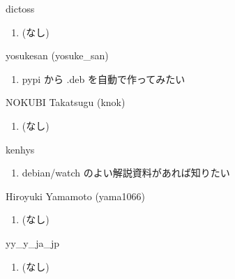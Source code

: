 \begin{prework}{ dictoss }
  \begin{enumerate}
  \item (なし)
  \end{enumerate}
\end{prework}

\begin{prework}{ yosukesan (yosuke\_san) }
  \begin{enumerate}
  \item pypi から .deb を自動で作ってみたい
  \end{enumerate}
\end{prework}

\begin{prework}{ NOKUBI Takatsugu (knok) }
  \begin{enumerate}
  \item (なし)
  \end{enumerate}
\end{prework}

\begin{prework}{ kenhys }
  \begin{enumerate}
  \item debian/watch のよい解説資料があれば知りたい
  \end{enumerate}
\end{prework}

\begin{prework}{ Hiroyuki Yamamoto (yama1066) }
  \begin{enumerate}
  \item (なし)
  \end{enumerate}
\end{prework}

\begin{prework}{ yy\_y\_ja\_jp }
  \begin{enumerate}
  \item (なし)
  \end{enumerate}
\end{prework}
